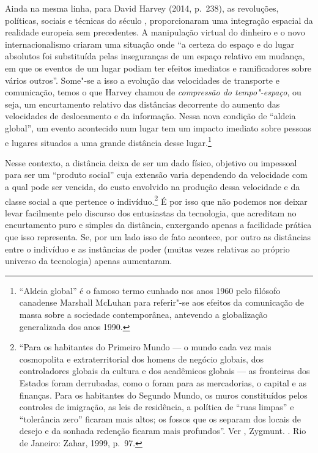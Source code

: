 Ainda na mesma linha, para David Harvey (2014, p.~238), as revoluções, políticas,
sociais e técnicas do século , proporcionaram uma integração espacial
da realidade europeia sem precedentes. A manipulação virtual do dinheiro
e o novo internacionalismo criaram uma situação onde ``a certeza do
espaço e do lugar absolutos foi substituída pelas inseguranças de um
espaço relativo em mudança, em que os eventos de um lugar podiam ter
efeitos imediatos e ramificadores sobre vários outros''.
Some"-se a isso a evolução das velocidades de transporte e comunicação,
temos o que Harvey chamou de \emph{compressão do tempo"-espaço}, ou seja,
um encurtamento relativo das distâncias decorrente do aumento das
velocidades de deslocamento e da informação. Nessa nova condição de
``aldeia global'', um evento acontecido num lugar tem um impacto
imediato sobre pessoas e lugares situados a uma grande distância desse
lugar.\footnote{``Aldeia global'' é o famoso termo cunhado nos anos 1960
  pelo filósofo canadense Marshall
  McLuhan para referir"-se aos efeitos da comunicação de massa sobre a
  sociedade contemporânea, antevendo a globalização generalizada dos
  anos 1990.}

Nesse contexto, a distância deixa de ser um dado físico, objetivo ou
impessoal para ser um ``produto social'' cuja extensão varia dependendo
da velocidade com a qual pode ser vencida, do custo envolvido na
produção dessa velocidade e da classe social a que pertence o
indivíduo.\footnote{``Para os habitantes do Primeiro Mundo --- o mundo
  cada vez mais cosmopolita e extraterritorial dos homens de negócio
  globais, dos controladores globais da cultura e dos acadêmicos globais
  --- as fronteiras dos Estados foram derrubadas, como o foram para as
  mercadorias, o capital e as finanças. Para os habitantes do Segundo
  Mundo, os muros constituídos pelos controles de imigração, as leis de
  residência, a política de ``ruas limpas'' e ``tolerância zero''
  ficaram mais altos; os fossos que os separam dos locais de desejo e da
  sonhada redenção ficaram mais profundos''. Ver ,
  Zygmunt. {}. Rio de
  Janeiro: Zahar, 1999, p.~97.} É por isso que não podemos nos deixar
levar facilmente pelo discurso dos entusiastas da tecnologia, que
acreditam no encurtamento puro e simples da distância, enxergando apenas
a facilidade prática que isso representa. Se, por um lado isso de fato
acontece, por outro as distâncias entre o indivíduo e as instâncias de
poder (muitas vezes relativas ao próprio universo da tecnologia) apenas
aumentaram.

